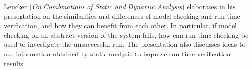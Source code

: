 

Leucker
\cite{isola-2016-leucker}
({\em On Combinations of Static and Dynamic Analysis})
elaborates in his presentation on the similarities and differences of
model checking and run-time verification, and how they can benefit
from each other. In particular, if model checking on an abstract
version of the system fails, how can run-time checking be used to
investigate the unsuccessful run. The presentation also discusses ideas
to use information obtained by static analysis to improve run-time
verification results.